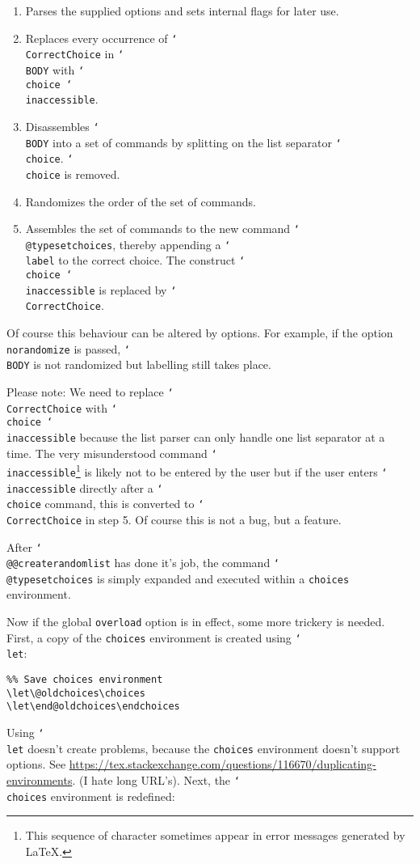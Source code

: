 \documentclass[12pt,a4paper]{exam}
\providecommand{\texorpdfstring}[2]{#1}
\newcommand{\bs}{\texorpdfstring{\char`\\}{}}
\begin{document}
\begin{enumerate}
\item Parses the supplied options and sets internal flags for later use.
\item Replaces every occurrence of \texttt{\bs CorrectChoice} in \texttt{\bs BODY} 
      with \texttt{\bs choice \bs inaccessible}.
\item Disassembles \texttt{\bs BODY} into a set of commands by splitting on the list
      separator \texttt{\bs choice}. \texttt{\bs choice} is removed.
\item Randomizes the order of the set of commands.
\item Assembles the set of commands to the new command \texttt{\bs @typesetchoices},
      thereby appending a \texttt{\bs label} to the correct choice. The construct
      \texttt{\bs choice \bs inaccessible} is replaced by \texttt{\bs CorrectChoice}.
\end{enumerate}

Of course this behaviour can be altered by options. For example, if the option
\texttt{norandomize} is passed, \texttt{\bs BODY} is not randomized but labelling still
takes place.

Please note: We need to replace \texttt{\bs CorrectChoice} with \texttt{\bs choice \bs inaccessible}
because the list parser can only handle one list separator at a time. The very misunderstood command
\texttt{\bs inaccessible}\footnote{This sequence of character sometimes appear in error messages generated by \LaTeX.} is likely not to be entered by the user but if the user enters \texttt{\bs inaccessible}
directly after a \texttt{\bs choice} command, this is converted to \texttt{\bs CorrectChoice}
in step 5. Of course this is not a bug, but a feature.

After \texttt{\bs @@createrandomlist} has done it's job, the command \texttt{\bs @typesetchoices}
is simply expanded and executed within a \texttt{choices} environment.

Now if the global \texttt{overload} option is in effect, some more trickery is needed. First, a copy
of the \texttt{choices} environment is created using \texttt{\bs let}:

\begin{lstlisting}
%% Save choices environment
\let\@oldchoices\choices
\let\end@oldchoices\endchoices
\end{lstlisting}

Using \texttt{\bs let} doesn't create problems, because the \texttt{choices} environment
doesn't support options. See \url{https://tex.stackexchange.com/questions/116670/duplicating-environments}. (I hate long URL's). Next, the \texttt{\bs choices} environment is redefined:
\end{document}
